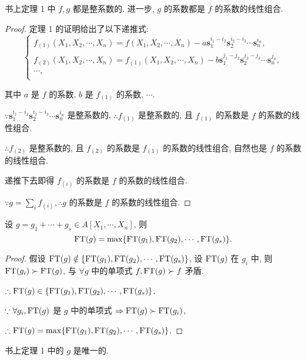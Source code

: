 \documentclass[color=black,device=normal,lang=cn,mode=geye]{elegantnote}
\begin{document}
\begin{theorem}
    书上定理 1 中 $f,g$ 都是整系数的. 进一步, $g$ 的系数都是 $f$ 的系数的线性组合.
\end{theorem}
\begin{proof}
    定理 1 的证明给出了以下递推式:
    \[\begin{cases}
        f_{(1)}(X_1,X_2,\cdots,X_n)=f(X_1,X_2,\cdots,X_n)-a\mathbf{s}_1^{i_1-i_2}\mathbf{s}_2^{i_2-i_3}\cdots\mathbf{s}_n^{i_n}, \\
        f_{(2)}(X_1,X_2,\cdots,X_n)=f_{(1)}(X_1,X_2,\cdots,X_n)-b\mathbf{s}_1^{j_1-j_2}\mathbf{s}_2^{j_2-j_3}\cdots\mathbf{s}_n^{j_n}, \\
        \cdots, \\
    \end{cases}\]

    其中 $a$ 是 $f$ 的系数, $b$ 是 $f_{(1)}$ 的系数, $\cdots$.

    $\because\mathbf{s}_1^{i_1-i_2}\mathbf{s}_2^{i_2-i_3}\cdots\mathbf{s}_n^{i_n}$ 是整系数的, $\therefore f_{(1)}$ 是整系数的, 且 $f_{(1)}$ 的系数是 $f$ 的系数的线性组合.

    $\therefore f_{(2)}$ 是整系数的, 且 $f_{(2)}$ 的系数是 $f_{(1)}$ 的系数的线性组合, 自然也是 $f$ 的系数的线性组合.

    递推下去即得 $f_{(i)}$ 的系数是 $f$ 的系数的线性组合.

    $\because g=\sum\limits_{i}f_{(i)},\therefore g$ 的系数是 $f$ 的系数的线性组合.
\end{proof}
\begin{lemma}\label{l2.1}
    设 $g=g_1+\cdots+g_s\in A[X_1,\cdots,X_n]$, 则
    \[\operatorname{FT} (g)=\max\{\operatorname{FT} (g_1),\operatorname{FT} (g_2),\cdots,\operatorname{FT} (g_s)\}.\]
\end{lemma}
\begin{proof}
    假设 $\operatorname{FT} (g)\notin\{\operatorname{FT} (g_1),\operatorname{FT} (g_2),\cdots,\operatorname{FT} (g_s)\}$, 设 $\operatorname{FT} (g)$ 在 $g_i$ 中, 则 $\operatorname{FT} (g_i)\succ\operatorname{FT} (g)$, 与 $\forall g$ 中的单项式 $f,\operatorname{FT} (g)\succ f$ 矛盾.

    $\therefore\operatorname{FT} (g)\in\{\operatorname{FT} (g_1),\operatorname{FT} (g_2),\cdots,\operatorname{FT} (g_s)\}$.

    $\because\forall g_i,\operatorname{FT} (g)$ 是 $g$ 中的单项式 $\Rightarrow\operatorname{FT} (g)\succ\operatorname{FT} (g_i)$,
    
    $\therefore\operatorname{FT} (g)=\max\{\operatorname{FT} (g_1),\operatorname{FT} (g_2),\cdots,\operatorname{FT} (g_s)\}$.
\end{proof}
\begin{theorem}
    书上定理 1 中的 $g$ 是唯一的.
\end{theorem}
\end{document}

